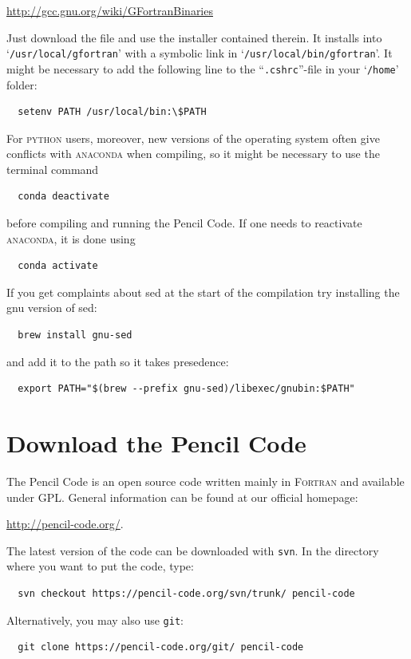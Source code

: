 \documentclass[a4paper,12pt]{article}
\newcommand{\command}[1]{\texttt{#1}}
\newcommand{\file}[1]{``\texttt{#1}''}
\newcommand{\directory}[1]{`\texttt{#1}'}
\newcommand{\name}[1]{\textsc{#1}}
\begin{document}
\url{http://gcc.gnu.org/wiki/GFortranBinaries}

Just download the file and use the installer contained therein.
It installs into \directory{/usr/local/gfortran} with
a symbolic link in \directory{/usr/local/bin/gfortran}. It might be necessary to add
the following line to the \file{.cshrc}-file in your \directory{/home} folder:
\begin{verbatim}
  setenv PATH /usr/local/bin:\$PATH
\end{verbatim} 
For \name{python} users, moreover, new versions of the operating system often give conflicts with \name{anaconda} when compiling, so it might be necessary to use the terminal command 
\begin{verbatim}
  conda deactivate
\end{verbatim}
before compiling and running the Pencil Code.
If one needs to reactivate \name{anaconda}, it is done using
\begin{verbatim}
  conda activate
\end{verbatim}

If you get complaints about sed at the start of the compilation try installing the gnu version of sed:
\begin{verbatim}
  brew install gnu-sed
\end{verbatim}
and add it to the path so it takes presedence:
\begin{verbatim}
  export PATH="$(brew --prefix gnu-sed)/libexec/gnubin:$PATH"
\end{verbatim}

\section{Download the Pencil Code}
\label{sec:download}
The Pencil Code is an open source code written mainly in \name{Fortran} and available under GPL.
General information can be found at our official homepage:

\url{http://pencil-code.org/}.

The latest version of the code can be downloaded with \command{svn}. In the
directory where you want to put the code, type:
\begin{verbatim}
  svn checkout https://pencil-code.org/svn/trunk/ pencil-code
\end{verbatim}

Alternatively, you may also use \command{git}:
\begin{verbatim}
  git clone https://pencil-code.org/git/ pencil-code
\end{verbatim}
\end{document}

